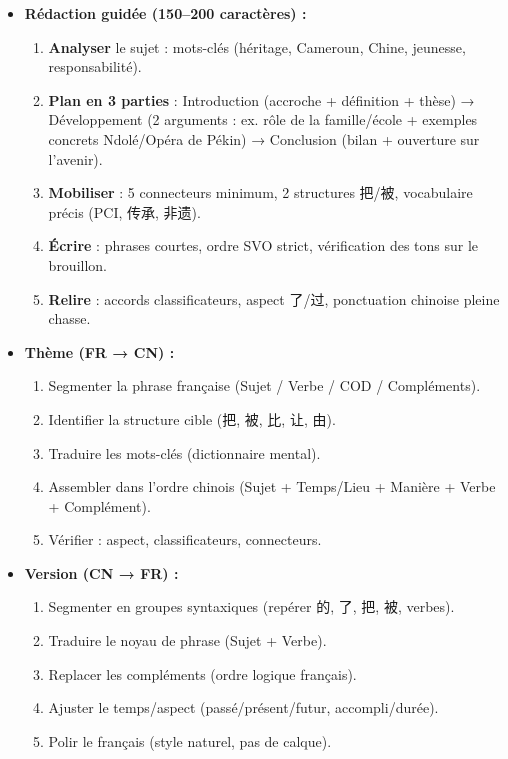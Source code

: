 \documentclass[11pt]{article}
\newcommand{\cle}[1]{{\popxbold\color{popdark}#1}}
\begin{document}
\begin{itemize}
\item \textbf{Rédaction guidée (150–200 caractères) :}
      \begin{enumerate}
      \item \textbf{Analyser} le sujet : mots-clés (héritage, Cameroun, Chine, jeunesse, responsabilité).
      \item \textbf{Plan en 3 parties} : Introduction (accroche + définition + thèse) → Développement (2 arguments : ex. rôle de la famille/école + exemples concrets Ndolé/Opéra de Pékin) → Conclusion (bilan + ouverture sur l'avenir).
      \item \textbf{Mobiliser} : 5 connecteurs minimum, 2 structures \cle{把}/\cle{被}, vocabulaire précis (PCI, 传承, 非遗).
      \item \textbf{Écrire} : phrases courtes, ordre SVO strict, vérification des tons sur le brouillon.
      \item \textbf{Relire} : accords classificateurs, aspect \cle{了}/\cle{过}, ponctuation chinoise pleine chasse.
      \end{enumerate}
\item \textbf{Thème (FR → CN) :}
      \begin{enumerate}
      \item Segmenter la phrase française (Sujet / Verbe / COD / Compléments).
      \item Identifier la structure cible (把, 被, 比, 让, 由).
      \item Traduire les mots-clés (dictionnaire mental).
      \item Assembler dans l'ordre chinois (Sujet + Temps/Lieu + Manière + Verbe + Complément).
      \item Vérifier : aspect, classificateurs, connecteurs.
      \end{enumerate}
\item \textbf{Version (CN → FR) :}
      \begin{enumerate}
      \item Segmenter en groupes syntaxiques (repérer \cle{的}, \cle{了}, \cle{把}, \cle{被}, verbes).
      \item Traduire le noyau de phrase (Sujet + Verbe).
      \item Replacer les compléments (ordre logique français).
      \item Ajuster le temps/aspect (passé/présent/futur, accompli/durée).
      \item Polir le français (style naturel, pas de calque).
      \end{enumerate}
\end{itemize}
\end{document}
